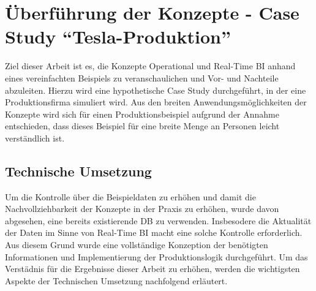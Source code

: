 \chapter{Überführung der Konzepte - Case Study \enquote{Tesla-Produktion}}
Ziel dieser Arbeit ist es, die Konzepte Operational und Real-Time \ac{BI} anhand eines vereinfachten Beispiels zu veranschaulichen und Vor- und Nachteile abzuleiten. Hierzu wird eine hypothetische Case Study durchgeführt, in der eine Produktionsfirma simuliert wird. Aus den breiten Anwendungsmöglichkeiten der Konzepte wird sich für einen Produktionsbeispiel aufgrund der Annahme entschieden, dass dieses Beispiel für eine breite Menge an Personen leicht verständlich ist.
\section{Technische Umsetzung}
Um die Kontrolle über die Beispieldaten zu erhöhen und damit die Nachvollziehbarkeit der Konzepte in der Praxis zu erhöhen, wurde davon abgesehen, eine bereits existierende \ac{DB} zu verwenden. Insbesodere die Aktualität der Daten im Sinne von Real-Time \ac{BI} macht eine solche Kontrolle erforderlich.
Aus diesem Grund wurde eine vollständige Konzeption der benötigten Informationen und Implementierung der Produktionslogik durchgeführt. Um das Verstädnis für die Ergebnisse dieser Arbeit zu erhöhen, werden die wichtigsten Aspekte der Technischen Umsetzung nachfolgend erläutert.
